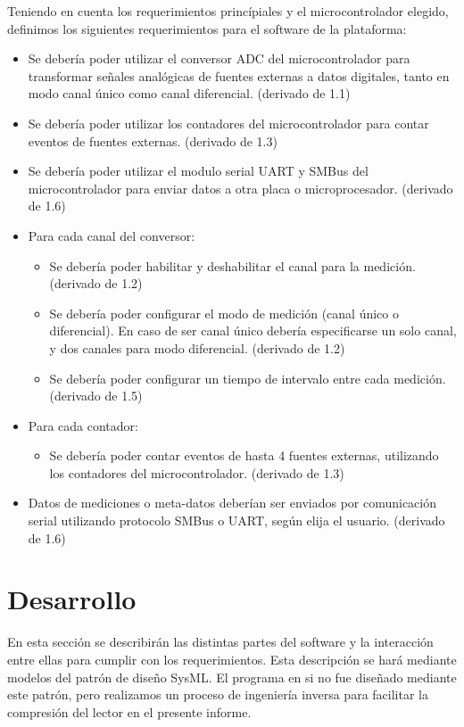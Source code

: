 Teniendo en cuenta los requerimientos princípiales y el microcontrolador elegido, definimos los siguientes requerimientos para el software de la plataforma:

\begin{itemize}
\item Se debería poder utilizar el conversor ADC del microcontrolador para transformar señales analógicas de fuentes externas a datos digitales, tanto en modo canal único como canal diferencial. (derivado de 1.1)
\item Se debería poder utilizar los contadores del microcontrolador para contar eventos de fuentes externas. (derivado de 1.3)
\item Se debería poder utilizar el modulo serial UART y SMBus del microcontrolador para enviar datos a otra placa o microprocesador. (derivado de 1.6)
\item Para cada canal del conversor:
\begin{itemize}
\item Se debería poder habilitar y deshabilitar el canal para la medición. (derivado de 1.2)
\item Se debería poder configurar el modo de medición (canal único o diferencial). En caso de ser canal único debería especificarse un solo canal, y dos canales para modo diferencial. (derivado de 1.2)
\item Se debería poder configurar un tiempo de intervalo entre cada medición. (derivado de 1.5)
\end{itemize}
\item Para cada contador:
\begin{itemize}
\item Se debería poder contar eventos de hasta 4 fuentes externas, utilizando los contadores del microcontrolador. (derivado de 1.3)
\end{itemize}
\item Datos de mediciones o meta-datos deberían ser enviados por comunicación serial utilizando protocolo SMBus o UART, según elija el usuario. (derivado de 1.6)

\end{itemize}



\section{Desarrollo} %
\label{it2:sec:desarrollo}

En esta sección se describirán las distintas partes del software y la interacción entre ellas para cumplir con los requerimientos. Esta descripción se hará mediante modelos del patrón de diseño SysML. El programa en si no fue diseñado mediante este patrón, pero realizamos un proceso de ingeniería inversa para facilitar la compresión del lector en el presente informe.

